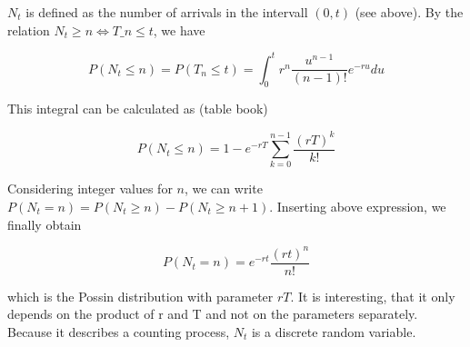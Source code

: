 \(N_t\) is defined as the number of arrivals in the intervall $(0,t)$ (see above). By the relation $N_t \geq n \Leftrightarrow T\_n \leq t$, we have

\[ P(N_t \leq n) = P(T_n \leq t) = \int_0^t r^n \frac{u^{n-1}}{(n-1)!}e^{-ru} du \]

This integral can be calculated as (table book)

\[ P(N_t \leq n) = 1 - e^{-rT} \sum_{k=0}^{n-1} \frac{(rT)^k}{k!}\]

Considering integer values for \(n\), we can write
\(P(N_t=n)=P(N_t \geq n)-P(N_t \geq n+1)\). Inserting above expression,
we finally obtain

\[ P(N_t=n) = e^{-rt} \frac{(rt)^n}{n!}\]

which is the Possin distribution with parameter \(rT\). It is
interesting, that it only depends on the product of r and T and not on
the parameters separately. Because it describes a counting process,
\(N_t\) is a discrete random variable.
